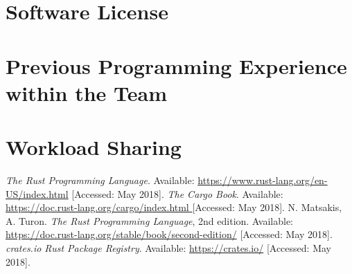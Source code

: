 \documentclass[a4paper, 11pt]{article}
\begin{document}
\section*{Software License}
\lipsum[6]

\section*{Previous Programming Experience within the Team}
\lipsum[7]

\section*{Workload Sharing}
\lipsum[8]

\begin{thebibliography}{9}
 \emph{The Rust Programming Language}. Available: \url{https://www.rust-lang.org/en-US/index.html} [Accessed: May 2018].
 \emph{The Cargo Book}. Available: \url{https://doc.rust-lang.org/cargo/index.html }[Accessed: May 2018].
 N. Matsakis, A. Turon. \emph{The Rust Programming Language}, 2nd edition. Available: \url{https://doc.rust-lang.org/stable/book/second-edition/} [Accessed: May 2018].
 \emph{crates.io Rust Package Registry}. Available: \url{https://crates.io/} [Accessed: May 2018].
\end{thebibliography}
\end{document}
